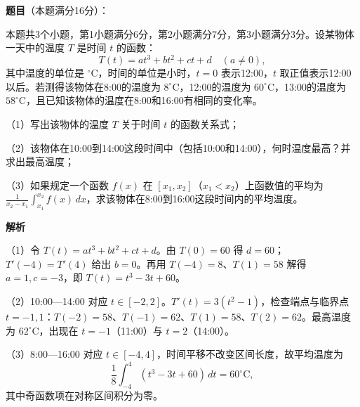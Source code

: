\begin{answer}

\textbf{题目}（本题满分16分）：

本题共3个小题，第1小题满分6分，第2小题满分7分，第3小题满分3分。设某物体一天中的温度 $T$ 是时间 $t$ 的函数：
\nopagebreak[4]
\[
T(t)=at^3+bt^2+ct+d\quad(a\ne0),
\]
其中温度的单位是 $^\circ\mathrm C$，时间的单位是小时，$t=0$ 表示12:00，$t$ 取正值表示12:00以后。若测得该物体在8:00的温度为 $8^\circ\mathrm C$，12:00的温度为 $60^\circ\mathrm C$，13:00的温度为 $58^\circ\mathrm C$，且已知该物体的温度在8:00和16:00有相同的变化率。

（1）写出该物体的温度 $T$ 关于时间 $t$ 的函数关系式；

（2）该物体在10:00到14:00这段时间中（包括10:00和14:00），何时温度最高？并求出最高温度；

（3）如果规定一个函数 $f(x)$ 在 $[x_1,x_2]$（$x_1<x_2$）上函数值的平均为 $\frac1{x_2-x_1}\int_{x_1}^{x_2}f(x)\,dx$，求该物体在8:00到16:00这段时间内的平均温度。

\textbf{解析}

（1）令 $T(t)=at^3+bt^2+ct+d$。由 $T(0)=60$ 得 $d=60$；$T'(-4)=T'(4)$ 给出 $b=0$。再用 $T(-4)=8$、$T(1)=58$ 解得 $a=1,c=-3$，即 $T(t)=t^3-3t+60$。

（2）10:00—14:00 对应 $t\in[-2,2]$。$T'(t)=3(t^2-1)$，检查端点与临界点 $t=-1,1$：$T(-2)=58$、$T(-1)=62$、$T(1)=58$、$T(2)=62$。最高温度为 $62^\circ\mathrm C$，出现在 $t=-1$（11:00）与 $t=2$（14:00）。

（3）8:00—16:00 对应 $t\in[-4,4]$，时间平移不改变区间长度，故平均温度为
\nopagebreak[4]
\[
\frac18\int_{-4}^{4}(t^3-3t+60)\,dt=60^\circ\mathrm C,
\]
其中奇函数项在对称区间积分为零。


\end{answer}
